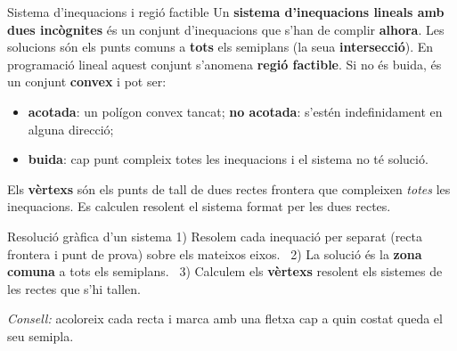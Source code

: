 \documentclass[11pt,a4paper]{article}
\begin{document}
\begin{defi}{Sistema d'inequacions i regió factible}
Un \textbf{sistema d'inequacions lineals amb dues incògnites} és un conjunt d'inequacions que s'han de complir \textbf{alhora}. Les solucions són els punts comuns a \textbf{tots} els semiplans (la seua \textbf{intersecció}). En programació lineal aquest conjunt s'anomena \textbf{regió factible}. Si no és buida, és un conjunt \textbf{convex} i pot ser:
\begin{itemize}
\item \textbf{acotada}: un polígon convex tancat; \quad \textbf{no acotada}: s'estén indefinidament en alguna direcció;
\item \textbf{buida}: cap punt compleix totes les inequacions i el sistema no té solució.
\end{itemize}
Els \textbf{vèrtexs} són els punts de tall de dues rectes frontera que compleixen \emph{totes} les inequacions. Es calculen resolent el sistema format per les dues rectes.
\end{defi}
\begin{defi}{Resolució gràfica d'un sistema}
1) Resolem cada inequació per separat (recta frontera i punt de prova) sobre els mateixos eixos. \ 2) La solució és la \textbf{zona comuna} a tots els semiplans. \ 3) Calculem els \textbf{vèrtexs} resolent els sistemes de les rectes que s'hi tallen.

\smallskip
\emph{Consell:} acoloreix cada recta i marca amb una fletxa cap a quin costat queda el seu semipla.
\end{defi}
\end{document}
